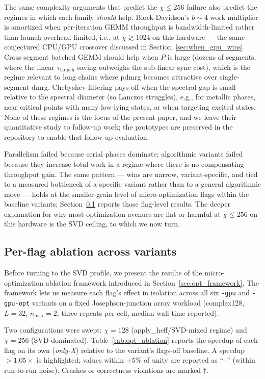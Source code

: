 \documentclass[preprint,12pt]{elsarticle}
\begin{document}
The same complexity arguments that predict the $\chi \le 256$ failure also predict the regimes in which each family \emph{should} help.
Block-Davidson's $b{\sim}4$ work multiplier is amortized when per-iteration GEMM throughput is bandwidth-limited rather than launch-overhead-limited, i.e., at $\chi \gtrsim 1024$ on this hardware --- the same conjectured CPU/GPU crossover discussed in Section~\ref{sec:when_gpu_wins}.
Cross-segment batched GEMM should help when $P$ is large (dozens of segments, where the linear $\tau_\text{launch}$ saving outweighs the sub-linear sync cost), which is the regime relevant to long chains where pdmrg becomes attractive over single-segment dmrg.
Chebyshev filtering pays off when the spectral gap is small relative to the spectral diameter (so Lanczos struggles), e.g., for metallic phases, near critical points with many low-lying states, or when targeting excited states.
None of these regimes is the focus of the present paper, and we leave their quantitative study to follow-up work; the prototypes are preserved in the repository to enable that follow-up evaluation.

Parallelism failed because serial phases dominate; algorithmic variants failed because they increase total work in a regime where there is no compensating throughput gain.
The same pattern --- wins are narrow, variant-specific, and tied to a measured bottleneck of a specific variant rather than to a general algorithmic move --- holds at the smaller-grain level of micro-optimization flags within the baseline variants; Section~\ref{sec:opt_ablation} reports those flag-level results.
The deeper explanation for why most optimization avenues are flat or harmful at $\chi \le 256$ on this hardware is the SVD ceiling, to which we now turn.

\subsection{Per-flag ablation across variants}
\label{sec:opt_ablation}

Before turning to the SVD profile, we present the results of the micro-optimization ablation framework introduced in Section~\ref{sec:opt_framework}.
The framework lets us measure each flag's effect in isolation across all six \texttt{-gpu} and \texttt{-gpu-opt} variants on a fixed Josephson-junction array workload (complex128, $L=32$, $n_\text{max}=2$, three repeats per cell, median wall-time reported).

Two configurations were swept: $\chi=128$ (apply\_heff/SVD-mixed regime) and $\chi=256$ (SVD-dominated).
Table~\ref{tab:opt_ablation} reports the speedup of each flag on its own (\emph{only-X}) relative to the variant's flags-off baseline.
A speedup $> 1.05\times$ is highlighted; values within $\pm 5\%$ of unity are reported as ``--'' (within run-to-run noise).
Crashes or correctness violations are marked $\dagger$.
\end{document}
